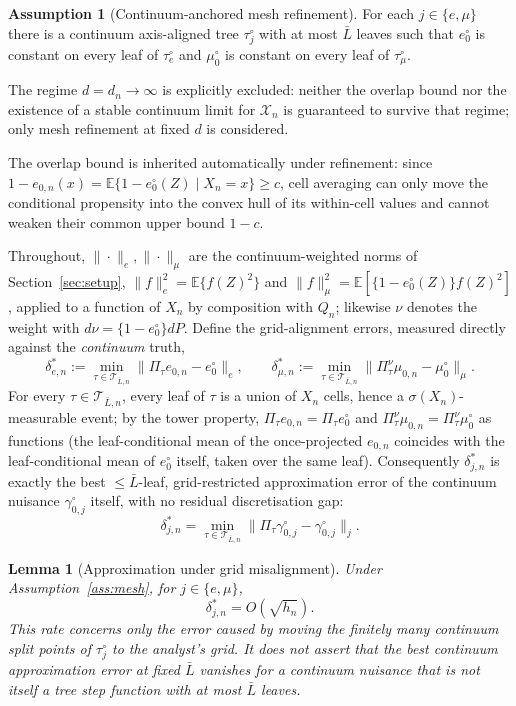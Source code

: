 \documentclass[11pt]{article}
\theoremstyle{plain}
\newtheorem{lemma}[theorem]{Lemma}
\theoremstyle{definition}
\newtheorem{assumption}{Assumption}
\theoremstyle{remark}
\newcommand{\E}{\mathbb{E}}
\newcommand{\cX}{\mathcal{X}}
\newcommand{\cT}{\mathcal{T}}
\newcommand{\ez}{e_0}
\newcommand{\mz}{\mu_0}
\newcommand{\ezn}{e_{0,n}}
\newcommand{\mzn}{\mu_{0,n}}
\begin{document}
\begin{assumption}[Continuum-anchored mesh refinement]
For each $j\in\{e,\mu\}$ there is a continuum axis-aligned tree $\tau_j^\circ$
with at most $\bar L$ leaves such that $\ez^\circ$ is constant on every leaf
of $\tau_e^\circ$ and $\mz^\circ$ is constant on every leaf of $\tau_\mu^\circ$.

The regime $d=d_n\to\infty$ is explicitly excluded: neither the overlap
bound nor the existence of a stable continuum limit for $\cX_n$ is
guaranteed to survive that regime; only mesh refinement at fixed $d$ is
considered.
\end{assumption}

The overlap bound is inherited automatically under refinement: since
$1-\ezn(x)=\E\{1-\ez^\circ(Z)\mid X_n=x\}\ge c$, cell averaging can only move
the conditional propensity into the convex hull of its within-cell values
and cannot weaken their common upper bound $1-c$.

Throughout, $\|\cdot\|_e,\|\cdot\|_\mu$ are the continuum-weighted norms of
Section~\ref{sec:setup}, $\|f\|_e^2=\E\{f(Z)^2\}$ and
$\|f\|_\mu^2=\E[\{1-\ez^\circ(Z)\}f(Z)^2]$, applied to a function of $X_n$ by
composition with $Q_n$; likewise $\nu$ denotes the weight with
$d\nu=\{1-\ez^\circ\}dP$. Define the grid-alignment errors, measured
directly against the \emph{continuum} truth,
\begin{equation}\label{eq:mesh-delta}
  \delta^*_{e,n}
  :=\min_{\tau\in\cT_{\bar L,n}}\|\Pi_\tau\ezn-\ez^\circ\|_e,
  \qquad
  \delta^*_{\mu,n}
  :=\min_{\tau\in\cT_{\bar L,n}}\|\Pi^\nu_\tau\mzn-\mz^\circ\|_\mu.
\end{equation}
For every $\tau\in\cT_{\bar L,n}$, every leaf of $\tau$ is a union of $X_n$
cells, hence a $\sigma(X_n)$-measurable event; by the tower property,
$\Pi_\tau\ezn=\Pi_\tau\ez^\circ$ and $\Pi^\nu_\tau\mzn=\Pi^\nu_\tau\mz^\circ$
as functions (the leaf-conditional mean of the once-projected $\ezn$
coincides with the leaf-conditional mean of $\ez^\circ$ itself, taken over
the same leaf). Consequently $\delta^*_{j,n}$ is exactly the best
$\le\bar L$-leaf, grid-restricted approximation error of the continuum
nuisance $\gamma_{0,j}^\circ$ itself, with no residual discretisation gap:
\[
  \delta^*_{j,n}=\min_{\tau\in\cT_{\bar L,n}}
  \|\Pi_\tau\gamma_{0,j}^\circ-\gamma_{0,j}^\circ\|_j .
\]

\begin{lemma}[Approximation under grid misalignment]\label{lem:mesh-approx}
Under Assumption~\ref{ass:mesh}, for $j\in\{e,\mu\}$,
\[
  \delta^*_{j,n}=O(\sqrt{h_n}).
\]
This rate concerns only the error caused by moving the finitely many
continuum split points of $\tau_j^\circ$ to the analyst's grid. It does not
assert that the best continuum approximation error at fixed $\bar L$
vanishes for a continuum nuisance that is not itself a tree step function
with at most $\bar L$ leaves.
\end{lemma}
\end{document}
